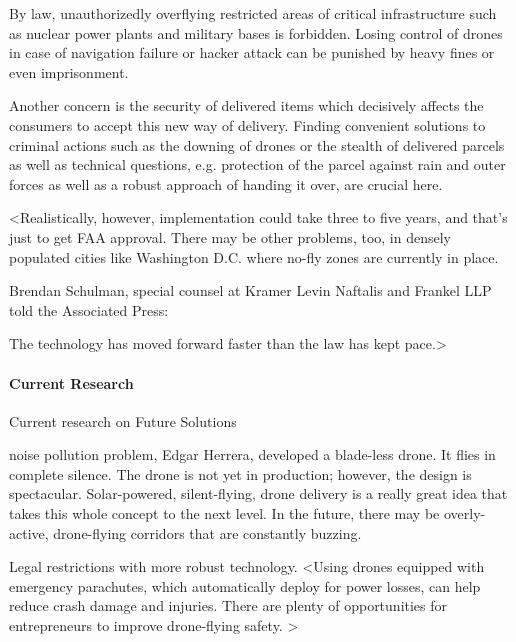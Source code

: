 By law, unauthorizedly overflying restricted areas of critical infrastructure 
such as nuclear power plants
and military bases is forbidden.
Losing control of drones in case of navigation failure or hacker attack
can be punished by heavy fines or even imprisonment.

Another concern is the security of delivered items
which decisively affects the consumers to accept this new way of delivery.
Finding convenient solutions to criminal actions such as the downing of drones 
or the stealth of delivered parcels as well as 
technical questions, e.g. protection of the parcel against rain and outer forces
as well as a robust approach of handing it over, are crucial here.


<Realistically, however, implementation could take three to five years, and that’s just to get FAA approval. There may be other problems, too, in densely populated cities like Washington D.C. where no-fly zones are currently in place.

Brendan Schulman, special counsel at Kramer Levin Naftalis and Frankel LLP told the Associated Press:

    The technology has moved forward faster than the law has kept pace.>


\paragraph{Current Research}
Current research on Future Solutions

noise pollution problem, 
Edgar Herrera, developed a blade-less drone. 
It flies in complete silence. 
The drone is not yet in production; 
however, the design is spectacular. 
Solar-powered, silent-flying, drone delivery is a really great idea that takes this whole concept to the next level.
In the future, there may be overly-active, 
drone-flying corridors that are constantly buzzing. 


Legal restrictions with more robust technology.
<Using drones equipped with emergency parachutes, 
which automatically deploy for power losses, 
can help reduce crash damage and injuries. 
There are plenty of opportunities for entrepreneurs to improve drone-flying safety. >


